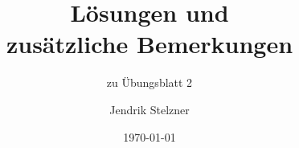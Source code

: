 \documentclass[a4paper, 10pt, numbers = noenddot]{scrartcl}
\title{Lösungen und \\ zusätzliche Bemerkungen}
\subtitle{zu Übungsblatt 2}
\author{Jendrik Stelzner}
\date{\today}
\begin{document}
\maketitle





\begin{appendices}

\end{appendices}
\end{document}
